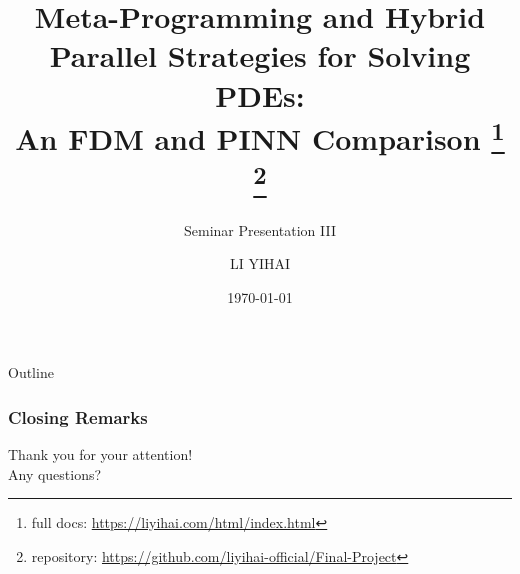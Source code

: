 \documentclass{my-Presentation}
\title[An FDM and PINN Comparison]{
  Meta-Programming and Hybrid Parallel Strategies for Solving PDEs: \\An FDM and PINN Comparison
  \footnote{full docs: \url{https://liyihai.com/html/index.html}}
  \footnote{repository: \url{https://github.com/liyihai-official/Final-Project}}
}
\subtitle{Seminar Presentation III}
\author[LI Yihai]{
  \normalsize
  LI YIHAI \\[1ex]
  \vspace*{-.5em}
}
\institute[Mathematics Institute]{
  Student ID: 23345919 \\[1ex]
  Supervision: Michael Peardon
}
\date{\today \vspace*{-1em}}
\begin{document}
\begin{frame}
  \titlepage
\end{frame}

\begin{frame}{Outline}
  \begin{multicols}{2}
    \tableofcontents
  \end{multicols}
\end{frame}












  




\begin{frame}
  \frametitle{Closing Remarks}
  \centering
  {\Large Thank you for your attention!}\\
  \vspace{2em}
  {\large Any questions?}
\end{frame}


\end{document}
